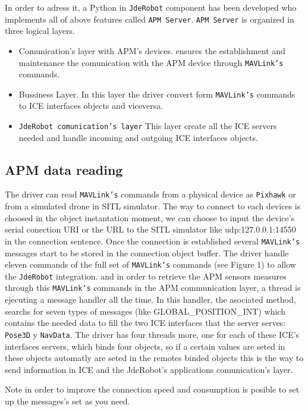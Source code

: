 \documentclass{llncs}
\begin{document}
In order to adress it, a Python in \texttt{JdeRobot} component has been developed who implements all of above features called \texttt{APM Server}. 
\texttt{APM Server} is organized in three logical layers.
\begin{itemize}
\item Comunication's layer with APM's devices. ensures the establishment and maintenance the comunication with the APM device through \texttt{MAVLink's} commands.
\item Bussiness Layer. In this layer the driver convert form \texttt{MAVLink's} commands to ICE interfaces objects and viceversa.
\item \texttt{JdeRobot comunication's layer} This layer create all the ICE servers needed and handle incoming and outgoing ICE interfaces objects.
\end{itemize}


\subsection{APM data reading}
\label{subsec:apm_data_reading}

The driver can read \texttt{MAVLink's} commands from a physical device as \texttt{Pixhawk} or from a simulated drone in SITL simulator. The way to connect to each devices is choosed in the object instantation moment, we can choose to input the device's serial conection URI or the URL to the SITL simulator like udp:127.0.0.1:14550 in the connection sentence. Once the connection is established several \texttt{MAVLink's} messages start to be stored in the connection object buffer.
The driver handle eleven commands of the full set of \texttt{MAVLink's} commands (see Figure 1) to allow the \texttt{JdeRobot} integration. and in order to retrieve the APM sensors measures through this \texttt{MAVLink's} commands in the APM communication layer, a thread is ejecuting a message handler all the time.
In this handler, the asociated method, searchs for seven types of messages (like GLOBAL\_POSITION\_INT) which contains the needed data to fill the two ICE interfaces that the server serves: \texttt{Pose3D} y \texttt{NavData}.
The driver has four threads more, one for each of these ICE's interfaces servers, which binds four objects, so if a certain values are seted in these objects automatly are seted in the remotes binded objects this is the way to send information in ICE and the JdeRobot's applications comunication's layer.


Note in order to improve the connection speed and consumption is posible to set up the messages's set as you need.
\end{document}
